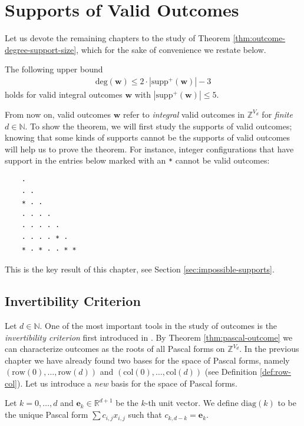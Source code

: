 \chapter{Supports of Valid Outcomes}

Let us devote the remaining chapters to the study of Theorem \ref{thm:outcome-degree-support-size}, which for the sake of convenience we restate below.

\begin{theorem*}
    The following upper bound 
    \begin{align*}
        \mathrm{deg}(\mathbf w) \leq 2 \cdot |\mathrm{supp}^+(\mathbf w)| - 3
    \end{align*}
    holds for valid integral outcomes \( \mathbf w \) with \( |\mathrm{supp}^+(\mathbf w)| \leq 5 \). 
\end{theorem*}

From now on, valid outcomes \( \mathbf{w} \) refer to \emph{integral} valid outcomes in \( \mathbb{Z}^{V_d} \) for \emph{finite} \( d \in \mathbb{N} \). To show the theorem, we will first study the supports of valid outcomes; knowing that some kinds of supports cannot be the supports of valid outcomes will help us to prove the theorem. For instance, integer configurations that have support in the entries below marked with an \texttt{*} cannot be valid outcomes:
\begin{verbatim}
    · 
    · · 
    * · · 
    · · · · 
    · · · · · 
    · · · · * · 
    * · * · · * *
\end{verbatim}
This is the key result of this chapter, see Section \ref{sec:impossible-supports}.

\section{Invertibility Criterion}

Let \( d \in \mathbb{N} \).
One of the most important tools in the study of outcomes is the \emph{invertibility criterion} first introduced in \cite{bik2022classifying}. By Theorem \ref{thm:pascal-outcome} we can characterize outcomes as the roots of all Pascal forms on \( \mathbb{Z}^{V_d} \). In the previous chapter we have already found two bases for the space of Pascal forms, namely \((\mathrm{row}(0), \dots, \mathrm{row}(d)) \) and \((\mathrm{col}(0), \dots, \mathrm{col}(d)) \) (see Definition \ref{def:row-col}). Let us introduce a \emph{new} basis for the space of Pascal forms.

\begin{definition}
    Let \( k = 0, \dots, d \) and \( \mathbf e_k \in \mathbb{R}^{d+1} \) be the \( k \)-th unit vector. We define \( \mathrm{diag}(k) \) to be the unique Pascal form \( \sum c_{i,j}x_{i,j} \) such that \( c_{k,d-k} = \mathbf e_k \).
\end{definition}


